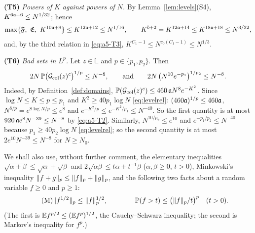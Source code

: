 \smallskip\noindent\textbf{(T5)} \emph{Powers of $K$ against powers of $N$.} By Lemma~\ref{lem:levels}(S4), $K^{6\mathfrak{a}+6}\le N^{1/32}$; hence
\[
 \max\{\mathfrak F,\ \mathfrak E,\ K^{10\fa+8}\}\le K^{12\fa+12}\le N^{1/16},\qquad K^{b+2}=K^{12\fa+14}\le K^{18\fa+18}\le N^{3/32},
\]
and, by the third relation in \eqref{eq:a5-T3}, $K^{C_1-1}\le N^{c_0(C_1-1)}\le N^{1/3}$.

\smallskip\noindent\textbf{(T6)} \emph{Bad sets in $L^p$.} Let $z\in\mathbb L$ and $p\in\{p_1,p_2\}$. Then
\[
 2N\,\mathbb{P}\big(\mathcal{G}_{\rm col}(z)^c\big)^{1/p}\le N^{-8},\qquad\text{and}\qquad2N\,\big(N^{10}e^{-p_1}\big)^{1/p_2}\le N^{-8}.
\]
Indeed, by Definition~\ref{def:domains}, $\mathbb{P}(\mathcal{G}_{\rm col}(z)^c)\le460\,\mathfrak{a} N^8e^{-K^2}$. Since $\log N\le K\le p\le p_1$ and $K^2\ge40p_1\log N$ \eqref{eq:levelrel}: $(460\mathfrak{a})^{1/p}\le460\mathfrak{a}$, $N^{8/p}=e^{8\log N/p}\le e^8$ and $e^{-K^2/p}\le e^{-K^2/p_1}\le N^{-40}$.
So the first quantity is at most $920\,\mathfrak{a} e^8N^{-39}\le N^{-8}$ by \eqref{eq:a5-T2}. Similarly, $N^{10/p_2}\le e^{10}$ and $e^{-p_1/p_2}\le N^{-40}$ because $p_1\ge40p_2\log N$ \eqref{eq:levelrel}; so the second quantity is at most $2e^{10}N^{-39}\le N^{-8}$ for $N\ge N_0$.

\smallskip We shall also use, without further comment, the elementary inequalities $\sqrt{\alpha+\beta}\le\sqrt\alpha+\sqrt\beta$ and $2\sqrt{\alpha\beta}\le t\alpha+t^{-1}\beta$ ($\alpha,\beta\ge0$, $t>0$), Minkowski's inequality $\|f+g\|_p\le\|f\|_p+\|g\|_p$,
and the following two facts about a random variable $f\ge0$ and $p\ge1$:
\begin{equation}\tag{M}\label{eq:a5-M}
 \|f^{1/2}\|_p\le\|f\|_p^{1/2},\qquad\qquad\mathbb{P}(f>t)\le\big(\|f\|_p/t\big)^p\quad(t>0).
\end{equation}
(The first is $\mathbb{E} f^{p/2}\le(\mathbb{E} f^p)^{1/2}$, the Cauchy--Schwarz inequality; the second is Markov's inequality for $f^p$.)

